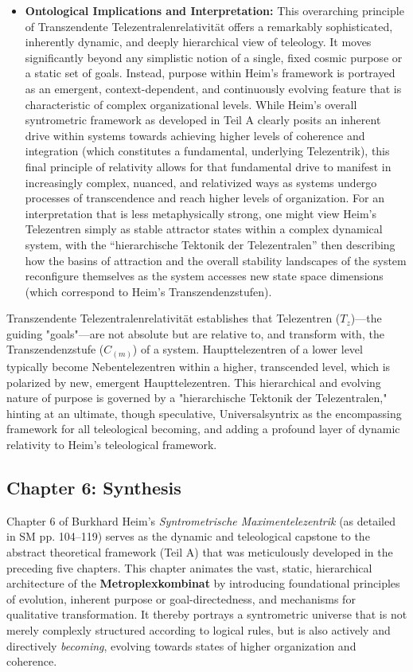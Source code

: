 \documentclass[12pt]{article}
\newcommand{\q}[1]{\enquote{#1}}
\newcommand{\telezentrum}{T_z}
\begin{document}
\begin{itemize}
    \item \textbf{Ontological Implications and Interpretation:}
    This overarching principle of Transzendente Telezentralenrelativität offers a remarkably sophisticated, inherently dynamic, and deeply hierarchical view of teleology. It moves significantly beyond any simplistic notion of a single, fixed cosmic purpose or a static set of goals. Instead, purpose within Heim's framework is portrayed as an emergent, context-dependent, and continuously evolving feature that is characteristic of complex organizational levels. While Heim's overall syntrometric framework as developed in Teil A clearly posits an inherent drive within systems towards achieving higher levels of coherence and integration (which constitutes a fundamental, underlying Telezentrik), this final principle of relativity allows for that fundamental drive to manifest in increasingly complex, nuanced, and relativized ways as systems undergo processes of transcendence and reach higher levels of organization. For an interpretation that is less metaphysically strong, one might view Heim's Telezentren simply as stable attractor states within a complex dynamical system, with the \q{hierarchische Tektonik der Telezentralen} then describing how the basins of attraction and the overall stability landscapes of the system reconfigure themselves as the system accesses new state space dimensions (which correspond to Heim's Transzendenzstufen).
\end{itemize}

Transzendente Telezentralenrelativität establishes that Telezentren (\(\telezentrum\))—the guiding "goals"—are not absolute but are relative to, and transform with, the Transzendenzstufe (\(C_{(m)}\)) of a system. Haupttelezentren of a lower level typically become Nebentelezentren within a higher, transcended level, which is polarized by new, emergent Haupttelezentren. This hierarchical and evolving nature of purpose is governed by a "hierarchische Tektonik der Telezentralen," hinting at an ultimate, though speculative, Universalsyntrix as the encompassing framework for all teleological becoming, and adding a profound layer of dynamic relativity to Heim's teleological framework.

\subsection{Chapter 6: Synthesis}
\label{sec:chapter6_synthesis}

Chapter 6 of Burkhard Heim's \textit{Syntrometrische Maximentelezentrik} (as detailed in SM pp. 104–119) serves as the dynamic and teleological capstone to the abstract theoretical framework (Teil A) that was meticulously developed in the preceding five chapters. This chapter animates the vast, static, hierarchical architecture of the \textbf{Metroplexkombinat} by introducing foundational principles of evolution, inherent purpose or goal-directedness, and mechanisms for qualitative transformation. It thereby portrays a syntrometric universe that is not merely complexly structured according to logical rules, but is also actively and directively \textit{becoming}, evolving towards states of higher organization and coherence.
\end{document}

